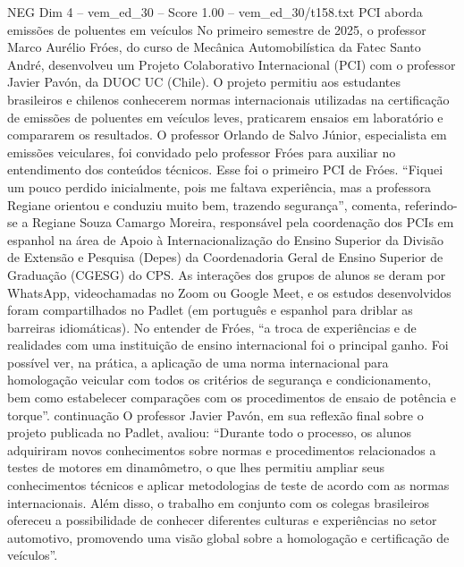 \begin{textsample}{NEG Dim 4 – vem\_ed\_30 – Score 1.00 – vem\_ed\_30/t158.txt}  \label{ex:f4_neg_099}
PCI aborda emissões de poluentes em veículos No primeiro semestre de 2025, o professor Marco Aurélio Fróes, do curso de Mecânica Automobilística da Fatec Santo André, desenvolveu um Projeto Colaborativo Internacional (PCI) com o professor Javier Pavón, da DUOC UC (Chile).
O projeto permitiu aos estudantes brasileiros e chilenos conhecerem normas internacionais utilizadas na certificação de emissões de poluentes em veículos leves, praticarem ensaios em laboratório e compararem os resultados.
O professor Orlando de Salvo Júnior, especialista em emissões veiculares, foi convidado pelo professor Fróes para auxiliar no entendimento dos conteúdos técnicos.
Esse foi o primeiro PCI de Fróes. “Fiquei um pouco perdido inicialmente, pois me faltava experiência, mas a professora Regiane orientou e conduziu muito bem, trazendo segurança”, comenta, referindo-se a Regiane Souza Camargo Moreira, responsável pela coordenação dos PCIs em espanhol na área de Apoio à Internacionalização do Ensino Superior da Divisão de Extensão e Pesquisa (Depes) da Coordenadoria Geral de Ensino Superior de Graduação (CGESG) do CPS.
As interações dos grupos de alunos se deram por WhatsApp, videochamadas no Zoom ou Google Meet, e os estudos desenvolvidos foram compartilhados no Padlet (em português e espanhol para driblar as barreiras idiomáticas).
No entender de Fróes, “a troca de experiências e de realidades com uma instituição de ensino internacional foi o principal ganho.
Foi possível ver, na prática, a aplicação de uma norma internacional para homologação veicular com todos os critérios de segurança e condicionamento, bem como estabelecer comparações com os procedimentos de ensaio de potência e torque”. continuação O professor Javier Pavón, em sua reflexão final sobre o projeto publicada no Padlet, avaliou: “Durante todo o processo, os alunos adquiriram novos conhecimentos sobre normas e procedimentos relacionados a testes de motores em dinamômetro, o que lhes permitiu ampliar seus conhecimentos técnicos e aplicar metodologias de teste de acordo com as normas internacionais.
Além disso, o trabalho em conjunto com os colegas brasileiros ofereceu a possibilidade de conhecer diferentes culturas e experiências no setor automotivo, promovendo uma visão global sobre a homologação e certificação de veículos”.

\end{textsample}
